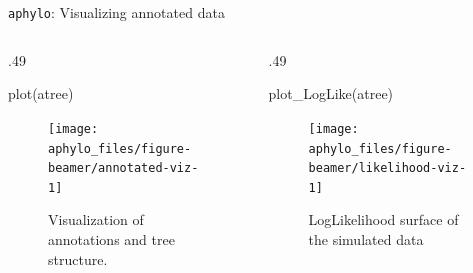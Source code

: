\documentclass[9pt,ignorenonframetext,]{beamer}
\newenvironment{Shaded}{\begin{snugshade}}{\end{snugshade}}
\newcommand{\KeywordTok}[1]{\textcolor[rgb]{0.94,0.87,0.69}{#1}}
\newcommand{\NormalTok}[1]{\textcolor[rgb]{0.80,0.80,0.80}{#1}}
\def\begincols{\begin{columns}[T]}
\def\begincol{\begin{column}[T]}
\def\endcol{\end{column}}
\def\endcols{\end{columns}}
\begin{document}
\begin{frame}[fragile,c]{\texttt{aphylo}: Visualizing annotated data}

\begincols

\begincol{.49\textwidth}

\footnotesize

\begin{Shaded}
\begin{Highlighting}[]
\KeywordTok{plot}\NormalTok{(atree)}
\end{Highlighting}
\end{Shaded}

\begin{figure}

{\centering \texttt{[image: aphylo\_files/figure-beamer/annotated-viz-1]} 

}

\caption{Visualization of annotations and tree structure.}\label{fig:annotated-viz}
\end{figure}

\normalsize

\endcol

\begincol{.49\textwidth}

\footnotesize

\begin{Shaded}
\begin{Highlighting}[]
\KeywordTok{plot_LogLike}\NormalTok{(atree)}
\end{Highlighting}
\end{Shaded}

\begin{figure}

{\centering \texttt{[image: aphylo\_files/figure-beamer/likelihood-viz-1]} 

}

\caption{LogLikelihood surface of the simulated data}\label{fig:likelihood-viz}
\end{figure}

\normalsize

\endcol

\endcols

\end{frame}
\end{document}
